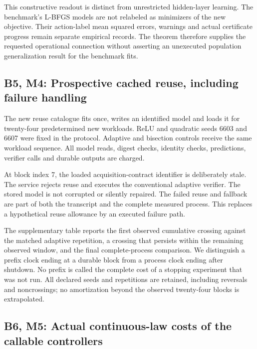 This constructive readout is distinct from unrestricted hidden-layer
learning. The benchmark's L-BFGS models are not relabeled as minimizers
of the new objective. Their action-label mean squared errors, warnings
and actual certificate progress remain separate empirical records. The
theorem therefore supplies the requested operational connection without
asserting an unexecuted population generalization result for the
benchmark fits.

\hypertarget{b5-m4-prospective-cached-reuse-including-failure-handling}{%
\subsection{B5, M4: Prospective cached reuse, including failure
handling}\label{b5-m4-prospective-cached-reuse-including-failure-handling}}

The new reuse catalogue fits once, writes an identified model and loads
it for twenty-four predetermined new workloads. ReLU and quadratic seeds
6603 and 6607 were fixed in the protocol. Adaptive and bisection
controls receive the same workload sequence. All model reads, digest
checks, identity checks, predictions, verifier calls and durable outputs
are charged.

At block index 7, the loaded acquisition-contract identifier is
deliberately stale. The service rejects reuse and executes the
conventional adaptive verifier. The stored model is not corrupted or
silently repaired. The failed reuse and fallback are part of both the
transcript and the complete measured process. This replaces a
hypothetical reuse allowance by an executed failure path.

The supplementary table reports the first observed cumulative crossing
against the matched adaptive repetition, a crossing that persists within
the remaining observed window, and the final complete-process
comparison. We distinguish a prefix clock ending at a durable block from
a process clock ending after shutdown. No prefix is called the complete
cost of a stopping experiment that was not run. All declared seeds and
repetitions are retained, including reversals and noncrossings; no
amortization beyond the observed twenty-four blocks is extrapolated.

\hypertarget{b6-m5-actual-continuous-law-costs-of-the-callable-controllers}{%
\subsection{B6, M5: Actual continuous-law costs of the callable
controllers}\label{b6-m5-actual-continuous-law-costs-of-the-callable-controllers}}

